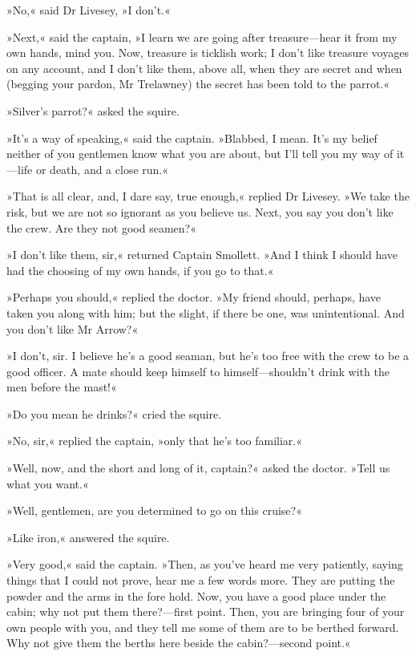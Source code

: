 »No,« said Dr Livesey, »I don't.«

»Next,« said the captain, »I learn we are going after treasure—hear it from my own hands, mind you. Now, treasure is ticklish work; I don't like treasure voyages on any account, and I don't like them, above all, when they are secret and when (begging your pardon, Mr Trelawney) the secret has been told to the parrot.«

»Silver's parrot?« asked the squire.

»It's a way of speaking,« said the captain. »Blabbed, I mean. It's my belief neither of you gentlemen know what you are about, but I'll tell you my way of it—life or death, and a close run.«

»That is all clear, and, I dare say, true enough,« replied Dr Livesey. »We take the risk, but we are not so ignorant as you believe us. Next, you say you don't like the crew. Are they not good seamen?«

»I don't like them, sir,« returned Captain Smollett. »And I think I should have had the choosing of my own hands, if you go to that.«

»Perhaps you should,« replied the doctor. »My friend should, perhaps, have taken you along with him; but the slight, if there be one, was unintentional. And you don't like Mr Arrow?«

»I don't, sir. I believe he's a good seaman, but he's too free with the crew to be a good officer. A mate should keep himself to himself—shouldn't drink with the men before the mast!«

»Do you mean he drinks?« cried the squire.

»No, sir,« replied the captain, »only that he's too familiar.«

»Well, now, and the short and long of it, captain?« asked the doctor. »Tell us what you want.«

»Well, gentlemen, are you determined to go on this cruise?«

»Like iron,« answered the squire.

»Very good,« said the captain. »Then, as you've heard me very patiently, saying things that I could not prove, hear me a few words more. They are putting the powder and the arms in the fore hold. Now, you have a good place under the cabin; why not put them there?—first point. Then, you are bringing four of your own people with you, and they tell me some of them are to be berthed forward. Why not give them the berths here beside the cabin?—second point.«

